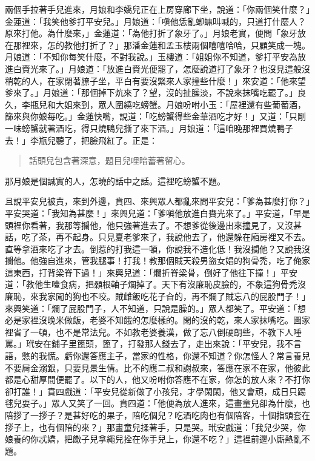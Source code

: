 兩個手拉著手兒進來，月娘和李嬌兒正在上房穿廊下坐，說道：「你兩個笑什麼？」金蓮道：「我笑他爹打平安兒。」月娘道：「嗔他恁亂蝍䗫叫喊的，只道打什麼人？原來打他。為什麼來，」金蓮道：「為他打折了象牙了。」月娘老實，便問「象牙放在那裡來，怎的教他打折了？」那潘金蓮和孟玉樓兩個嘻嘻哈哈，只顧笑成一塊。月娘道：「不知你每笑什麼，不對我說。」玉樓道：「姐姐你不知道，爹打平安為放進白賚光來了。」月娘道：「放進白賚光便罷了，怎麼說道打了象牙？也沒見這般沒稍乾的人，在家閉著膫子坐，平白有要沒緊來人家撞些什麼！」來安道：「他來望爹來了。」月娘道：「那個掉下炕來了？望，沒的扯臊淡，不說來抹嘴吃罷了。」良久，李瓶兒和大姐來到，眾人圍繞吃螃蟹。月娘吩咐小玉：「屋裡還有些葡萄酒，篩來與你娘每吃。」金蓮快嘴，說道：「吃螃蟹得些金華酒吃才好！」又道：「只剛一味螃蟹就著酒吃，得只燒鴨兒撕了來下酒。」月娘道：「這咱晚那裡買燒鴨子去！」李瓶兒聽了，把臉飛紅了。正是：
\begin{quote}
話頭兒包含著深意，題目兒哩暗蓄著留心。
\end{quote}
那月娘是個誠實的人，怎曉的話中之話。這裡吃螃蟹不題。

且說平安兒被責，來到外邊，賁四、來興眾人都亂來問平安兒：「爹為甚麼打你？」平安哭道：「我知為甚麼！」來興兒道：「爹嗔他放進白賚光來了。」平安道，「早是頭裡你看著，我那等攔他，他只強著進去了。不想爹從後邊出來撞見了，又沒甚話，吃了茶，再不起身。只見夏老爹來了，我說他去了，他還躲在廂房裡又不去。直等拿酒來吃了才去。倒惹的打我這一頓，你說我不造化低！我沒攔他？又說我沒攔他。他強自進來，管我腿事！打我！教那個賊天殺男盜女娼的狗骨禿，吃了俺家這東西，打背梁脊下過！」來興兒道：「爛折脊梁骨，倒好了他往下撞！」平安道：「教他生噎食病，把顙根軸子爛掉了。天下有沒廉恥皮臉的，不象這狗骨禿沒廉恥，來我家闖的狗也不咬。賊雌飯吃花子㒲的，再不爛了賊忘八的屁股門子！」來興笑道：「爛了屁股門子，人不知道，只說是臊的。」眾人都笑了。平安道：「想必是家裡沒晚米做飯，老婆不知餓的怎麼樣的。閑的沒的乾，來人家抹嘴吃。圖家裡省了一頓，也不是常法兒。不如教老婆養漢，做了忘八倒硬朗些，不教下人唾罵。」玳安在鋪子里篦頭，篦了，打發那人錢去了，走出來說：「平安兒，我不言語，憋的我慌。虧你還答應主子，當家的性格，你還不知道？你怎怪人？常言養兒不要屙金溺銀，只要見景生情。比不的應二叔和謝叔來，答應在家不在家，他彼此都是心甜厚間便罷了。以下的人，他又吩咐你答應不在家，你怎的放人來？不打你卻打誰！」賁四戲道：「平安兒從新做了小孩兒，才學閑閑，他又會頑，成日只踢毬兒耍子。」眾人又笑了一回。賁四道：「他便為放人進來，這畫童兒卻為什麼，也陪拶了一拶子？是甚好吃的果子，陪吃個兒？吃酒吃肉也有個陪客，十個指頭套在拶子上，也有個陪的來？」那畫童兒揉著手，只是哭。玳安戲道：「我兒少哭，你娘養的你忒嬌，把饊子兒拿繩兒拴在你手兒上，你還不吃？」這裡前邊小廝熱亂不題。

